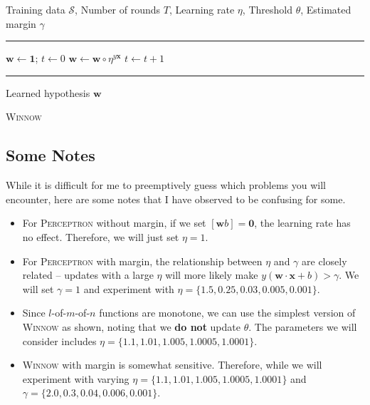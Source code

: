 \documentclass[12pt,letterpaper]{article}
\begin{document}
\begin{algorithm}[h]
\begin{algorithmic}
    Training data $\mathcal{S}$, Number of rounds $T$, Learning rate $\eta$,  Threshold $\theta$, Estimated margin $\gamma$
   \vspace{0.5em}
   \hrule
   \vspace{0.5em}
   \STATE $\mathbf{w} \leftarrow \mathbf{1}$; $t \leftarrow 0$
            \STATE $\mathbf{w} \leftarrow \mathbf{w} \circ \eta^{y \mathbf{x}}$
         \ENDIF
      \ENDFOR
      \STATE $t \leftarrow t + 1$
   \ENDWHILE
   \vspace{0.5em}
   \hrule
   \vspace{0.5em}
    Learned hypothesis $\mathbf{w}$ 
\caption{\textsc{Winnow}}
\label{alg:winnow}
\end{algorithmic}
\end{algorithm}

\subsection*{Some Notes}
While it is difficult for me to preemptively guess which problems you will encounter, here are some notes that I have observed to be confusing for some.
%
\begin{itemize}
\item
For \textsc{Perceptron} without margin, if we set $[\mathbf{w} b] = \mathbf{0}$, the learning rate has no effect.  Therefore, we will just set $\eta = 1$.
\item
For \textsc{Perceptron} with margin, the relationship between $\eta$ and $\gamma$ are closely related -- updates with a large $\eta$ will more likely make $y (\mathbf{w} \cdot \mathbf{x} + b) > \gamma$.  We will set $\gamma = 1$ and experiment with $\eta = \{1.5, 0.25, 0.03, 0.005, 0.001\}$.
\item
Since $l$-of-$m$-of-$n$ functions are monotone, we can use the simplest version of \textsc{Winnow} as shown, noting that we {\bf do not} update $\theta$.  The parameters we will consider includes $\eta = \{1.1, 1.01, 1.005, 1.0005, 1.0001\}$.
\item
\textsc{Winnow} with margin is somewhat sensitive.  Therefore, while we will experiment with varying $\eta = \{1.1, 1.01, 1.005, 1.0005, 1.0001\}$ and $\gamma = \{2.0, 0.3, 0.04, 0.006, 0.001\}$.
\end{itemize}
\end{document}

